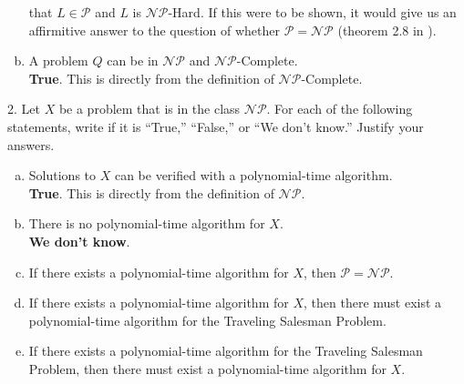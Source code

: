 \documentclass{scrartcl}
\begin{document}
\begin{flushleft}
\begin{enumerate}[(a)]
            that $L \in \mathcal{P}$ and $L$ is $\mathcal{NP}$-Hard. If this were to be shown, it
            would give us an affirmitive answer to the question of whether $\mathcal{P} =
            \mathcal{NP}$ (theorem 2.8 in \cite{modernapp}).
        \item A problem $Q$ can be in $\mathcal{NP}$ and $\mathcal{NP}$-Complete.\\
            \medskip
            \textbf{True}. This is directly from the definition of $\mathcal{NP}$-Complete.
    \end{enumerate}
    2. Let $X$ be a problem that is in the class $\mathcal{NP}$. For each of the following
    statements, write if it is ``True,'' ``False,'' or ``We don't know.'' Justify your answers.\\
    \begin{enumerate}[(a)]
        \item Solutions to $X$ can be verified with a polynomial-time algorithm.\\
            \medskip
            \textbf{True}. This is directly from the definition of $\mathcal{NP}$.
        \item There is no polynomial-time algorithm for $X$.\\
            \medskip
            \textbf{We don't know}.
        \item If there exists a polynomial-time algorithm for $X$, then $\mathcal{P} =
            \mathcal{NP}$.
        \item If there exists a polynomial-time algorithm for $X$, then there must exist a
            polynomial-time algorithm for the Traveling Salesman Problem.
        \item If there exists a polynomial-time algorithm for the Traveling Salesman Problem, then
            there must exist a polynomial-time algorithm for $X$.
    \end{enumerate}

    
    
\end{flushleft}
\end{document}
